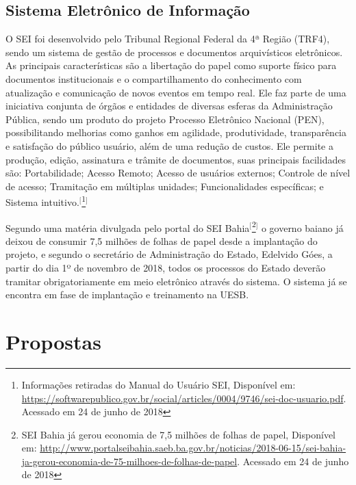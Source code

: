 \subsection{Sistema Eletrônico de Informação}

O SEI foi desenvolvido pelo Tribunal Regional Federal da 4ª Região (TRF4), sendo um sistema de gestão de processos e documentos arquivísticos eletrônicos. As principais características são a libertação do papel como suporte físico para documentos institucionais e o compartilhamento do conhecimento com atualização e comunicação de novos eventos em tempo real. Ele faz parte de uma iniciativa conjunta de órgãos e entidades de diversas esferas da Administração Pública, sendo um produto do projeto Processo Eletrônico Nacional (PEN), possibilitando melhorias como ganhos em agilidade, produtividade, transparência e satisfação do público usuário, além de uma redução de custos. Ele permite a produção, edição, assinatura e trâmite de documentos, suas principais facilidades são: Portabilidade; Acesso Remoto; Acesso de usuários externos; Controle de nível de acesso; Tramitação em múltiplas unidades; Funcionalidades específicas; e Sistema intuitivo.$^{[}$\footnote{Informações retiradas do Manual do Usuário SEI, Disponível em: \url{https://softwarepublico.gov.br/social/articles/0004/9746/sei-doc-usuario.pdf}.  Acessado em 24 de junho de 2018}$^{]}$

Segundo uma matéria divulgada pelo portal do SEI Bahia$^{[}$\footnote{SEI Bahia já gerou economia de 7,5 milhões de folhas de papel, Disponível em: \url{http://www.portalseibahia.saeb.ba.gov.br/noticias/2018-06-15/sei-bahia-ja-gerou-economia-de-75-milhoes-de-folhas-de-papel}.  Acessado em 24 de junho de 2018}$^{]}$ o governo baiano já deixou de consumir 7,5 milhões de folhas de papel desde a implantação do projeto, e segundo o secretário de Administração do Estado, Edelvido Góes, a partir do dia 1º de novembro de 2018, todos os processos do Estado deverão tramitar obrigatoriamente em meio eletrônico através do sistema. O sistema já se encontra em fase de implantação e treinamento na UESB.

\section{Propostas}